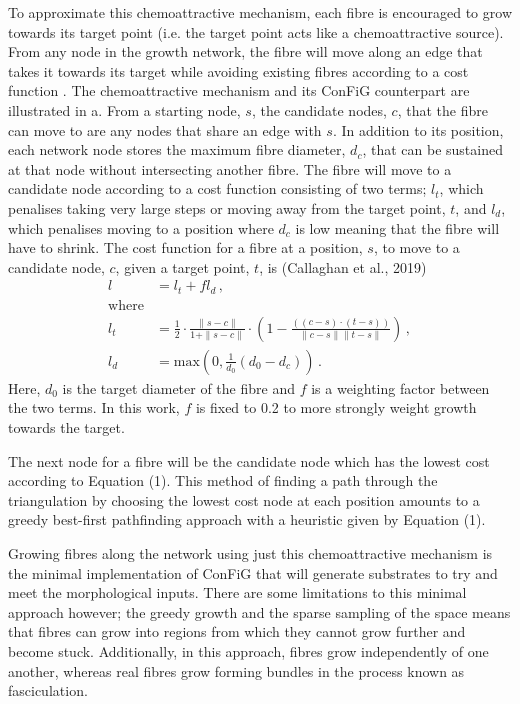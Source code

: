 To approximate this chemoattractive mechanism, each fibre is encouraged to grow towards its target point (i.e. the target point acts like a chemoattractive source). From any node in the growth network, the fibre will move along an edge that takes it towards its target while avoiding existing fibres according to a cost function \cite{Callaghan2019}. The chemoattractive mechanism and its ConFiG counterpart are illustrated in a.
From a starting node, $s$, the candidate nodes, $c$, that the fibre can move to are any nodes that share an edge with $s$. In addition to its position, each network node stores the maximum fibre diameter, $d_c$, that can be sustained at that node without intersecting another fibre. The fibre will move to a candidate node according to a cost function consisting of two terms; $l_t$, which penalises taking very large steps or moving away from the target point, $t$, and $l_d$, which penalises moving to a position where $d_c$ is low meaning that the fibre will have to shrink. The cost function for a fibre at a position, $s$, to move to a candidate node, $c$, given a target point, $t$, is (Callaghan et al., 2019)
\begin{align}
  l &= l_t+fl_d  \,,\label{eq:original_cost}\\
      \mathrm{where}\nonumber\\
  l_t &=  \frac{1}{2} \cdot \frac{\|s-c\|}{1+ \|s-c\|} \cdot \left(1- \frac{\left(\left(c-s\right) \cdot \left(t-s\right)\right)}{\|c-s\|\|t-s\|}\right)\,, \label{eq:original_lt}\\
  l_d &=\mathrm{max}\left(0, \frac{1}{d_0} \left(d_0 - d_c \right)\right) \,. \label{eq:original_ld}
\end{align}
Here, $d_0$ is the target diameter of the fibre and $f$ is a weighting factor between the two terms. In this work, $f$ is fixed to 0.2 to more strongly weight growth towards the target.

The next node for a fibre will be the candidate node which has the lowest cost according to Equation (1). This method of finding a path through the triangulation by choosing the lowest cost node at each position amounts to a greedy best-first pathfinding approach with a heuristic given by Equation (1).

Growing fibres along the network using just this chemoattractive mechanism is the minimal implementation of ConFiG that will generate substrates to try and meet the morphological inputs. There are some limitations to this minimal approach however; the greedy growth and the sparse sampling of the space means that fibres can grow into regions from which they cannot grow further and become stuck. Additionally, in this approach, fibres grow independently of one another, whereas real fibres grow forming bundles in the process known as fasciculation.

